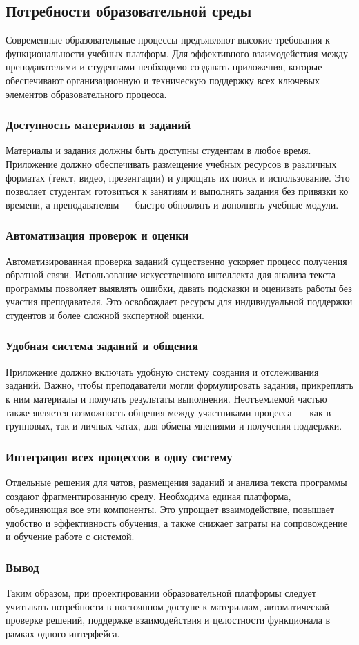 \subsection{Потребности образовательной среды}

Современные образовательные процессы предъявляют высокие требования к функциональности учебных платформ. Для эффективного взаимодействия между преподавателями и студентами необходимо создавать приложения, которые обеспечивают организационную и техническую поддержку всех ключевых элементов образовательного процесса.

\subsubsection{Доступность материалов и заданий}
Материалы и задания должны быть доступны студентам в любое время. Приложение должно обеспечивать размещение учебных ресурсов в различных форматах (текст, видео, презентации) и упрощать их поиск и использование. Это позволяет студентам готовиться к занятиям и выполнять задания без привязки ко времени, а преподавателям — быстро обновлять и дополнять учебные модули.

\subsubsection{Автоматизация проверок и оценки}
Автоматизированная проверка заданий существенно ускоряет процесс получения обратной связи. Использование искусственного интеллекта для анализа текста программы позволяет выявлять ошибки, давать подсказки и оценивать работы без участия преподавателя. Это освобождает ресурсы для индивидуальной поддержки студентов и более сложной экспертной оценки.

\subsubsection{Удобная система заданий и общения}
Приложение должно включать удобную систему создания и отслеживания заданий. Важно, чтобы преподаватели могли формулировать задания, прикреплять к ним материалы и получать результаты выполнения. Неотъемлемой частью также является возможность общения между участниками процесса~--- как в групповых, так и личных чатах, для обмена мнениями и получения поддержки.

\subsubsection{Интеграция всех процессов в одну систему}
Отдельные решения для чатов, размещения заданий и анализа текста программы создают фрагментированную среду. Необходима единая платформа, объединяющая все эти компоненты. Это упрощает взаимодействие, повышает удобство и эффективность обучения, а также снижает затраты на сопровождение и обучение работе с системой.

\subsubsection{Вывод}

Таким образом, при проектировании образовательной платформы следует учитывать потребности в постоянном доступе к материалам, автоматической проверке решений, поддержке взаимодействия и целостности функционала в рамках одного интерфейса.
